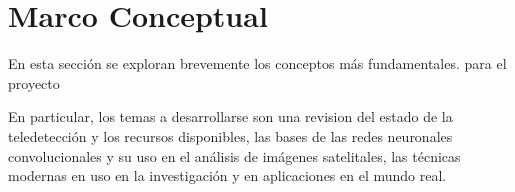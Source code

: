 \section{Marco Conceptual}

En esta sección se exploran brevemente los conceptos más fundamentales. para el proyecto

En particular, los temas a desarrollarse son una revision del estado de la teledetección y los recursos disponibles, las
bases de las redes neuronales convolucionales y su uso en el análisis de imágenes satelitales, las técnicas modernas en
uso en la investigación y en aplicaciones en el mundo real.






